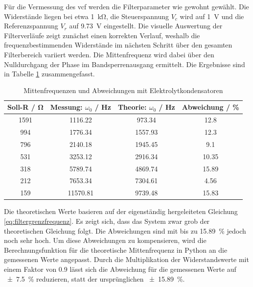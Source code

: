 \documentclass[../main_config.tex]{subfiles}
\begin{document}


Für die Vermessung des \gls{vcf} werden die Filterparameter wie gewohnt gewählt. Die Widerstände liegen bei etwa \SI{1}{\kilo\ohm}, die Steuerspannung $V_c$ wird auf \SI{1}{\volt} und die Referenzspannung $V_r$ auf \SI{9.73}{\volt} eingestellt. Die visuelle Auswertung der Filterverläufe zeigt zunächst einen korrekten Verlauf, weshalb die frequenzbestimmenden Widerstände im nächsten Schritt über den gesamten Filterbereich variiert werden. Die Mittenfrequenz wird dabei über den Nulldurchgang der Phase im Bandsperrenausgang ermittelt. Die Ergebnisse sind in Tabelle \ref{tab:mittenfrequenzen} zusammengefasst.\par
\medskip

\begin{table}[h]
    \centering
    \begin{tabular}{c|c|c|c}
        \textbf{Soll-R / \si{\ohm}} & \textbf{Messung: $\omega_0$ / \si{\hertz}} & \textbf{Theorie: $\omega_0$ / \si{\hertz}} & \textbf{Abweichung / \%} \\ \hline
        1591 & 1116.22 & 973.34 & 12.8 \\
        994 & 1776.34 & 1557.93 & 12.3 \\
        796 & 2140.18 & 1945.45 & 9.1 \\
        531 & 3253.12 & 2916.34 & 10.35 \\
        318 & 5789.74 & 4869.74 & 15.89 \\
        212 & 7653.34 & 7304.61 & 4.56 \\
        159 & 11570.81 & 9739.48 & 15.83 \\
    \end{tabular}
    \caption{Mittenfrequenzen und Abweichungen mit Elektrolytkondensatoren}
    \label{tab:mittenfrequenzen}
\end{table}

Die theoretischen Werte basieren auf der eigenständig hergeleiteten Gleichung \ref{eq:filtergrenzfrequenz}. Es zeigt sich, dass das System zwar grob der theoretischen Gleichung folgt. Die Abweichungen sind mit bis zu \SI{15.89}{\percent} jedoch noch sehr hoch. Um diese Abweichungen zu kompensieren, wird die Berechnungsfunktion für die theoretische Mittenfrequenz in Python an die gemessenen Werte angepasst. Durch die Multiplikation der Widerstandswerte mit einem Faktor von \num{0.9} lässt sich die Abweichung für die gemessenen Werte auf \SI{\pm7.5}{\percent} reduzieren, statt der ursprünglichen \SI{\pm15.89}{\percent}.\par
\medskip
\end{document}
